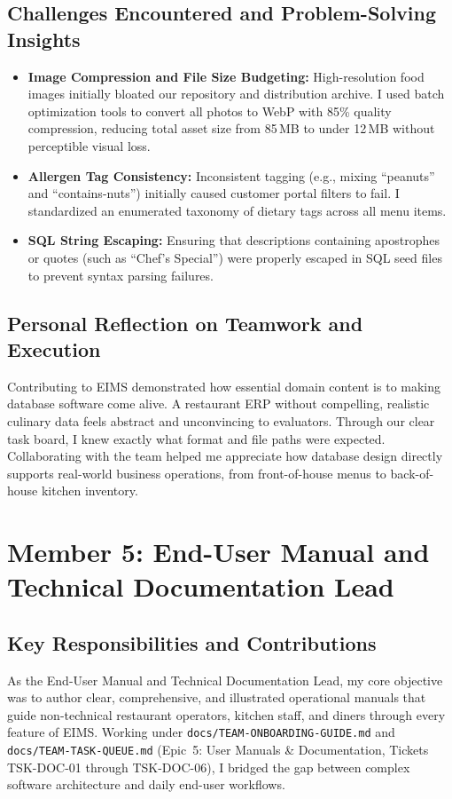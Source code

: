 \subsection{Challenges Encountered and Problem-Solving Insights}
\begin{itemize}
    \item \textbf{Image Compression and File Size Budgeting:} High-resolution food images initially bloated our repository and distribution archive. I used batch optimization tools to convert all photos to WebP with 85\% quality compression, reducing total asset size from 85\,MB to under 12\,MB without perceptible visual loss.
    \item \textbf{Allergen Tag Consistency:} Inconsistent tagging (e.g., mixing ``peanuts'' and ``contains-nuts'') initially caused customer portal filters to fail. I standardized an enumerated taxonomy of dietary tags across all menu items.
    \item \textbf{SQL String Escaping:} Ensuring that descriptions containing apostrophes or quotes (such as ``Chef's Special'') were properly escaped in SQL seed files to prevent syntax parsing failures.
\end{itemize}

\subsection{Personal Reflection on Teamwork and Execution}
Contributing to EIMS demonstrated how essential domain content is to making database software come alive. A restaurant ERP without compelling, realistic culinary data feels abstract and unconvincing to evaluators. Through our clear task board, I knew exactly what format and file paths were expected. Collaborating with the team helped me appreciate how database design directly supports real-world business operations, from front-of-house menus to back-of-house kitchen inventory.

\newpage
\section{Member 5: End-User Manual and Technical Documentation Lead}
\label{sec:reflection_member_5}

\subsection{Key Responsibilities and Contributions}
As the End-User Manual and Technical Documentation Lead, my core objective was to author clear, comprehensive, and illustrated operational manuals that guide non-technical restaurant operators, kitchen staff, and diners through every feature of EIMS. Working under \texttt{docs/TEAM-ONBOARDING-GUIDE.md} and \texttt{docs/TEAM-TASK-QUEUE.md} (Epic~5: User Manuals \& Documentation, Tickets TSK-DOC-01 through TSK-DOC-06), I bridged the gap between complex software architecture and daily end-user workflows.

